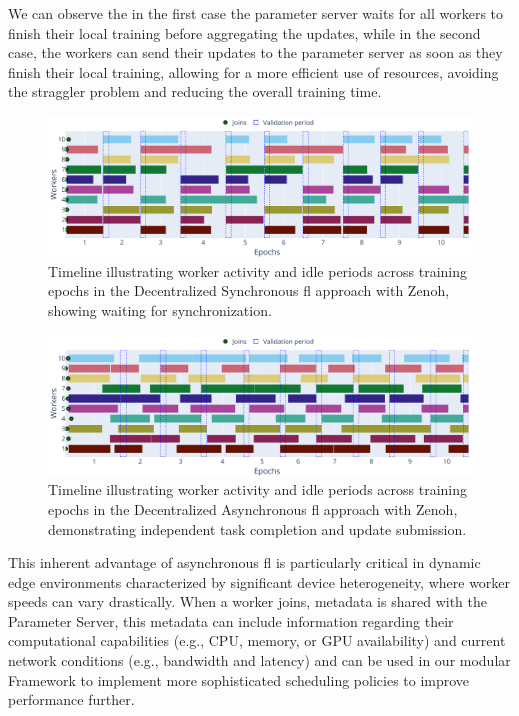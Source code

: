 We can observe the in the first case the parameter server waits for all workers to finish their local training before aggregating the updates, while in the second case, the workers can send their updates to the parameter server as soon as they finish their local training, allowing for a more efficient use of resources, avoiding the straggler problem and reducing the overall training time.

\begin{figure}[!htb]
    \centering
    \includegraphics[width=\linewidth]{figs/scenario1/ds_timeline.pdf}
    \caption[Timeline of Decentralized Synchronous FL with Zenoh]{Timeline illustrating worker activity and idle periods across training epochs in the Decentralized Synchronous \ac{fl} approach with Zenoh, showing waiting for synchronization.}
    \label{fig:ds_timeline}
\end{figure}

\begin{figure}[!htb]
    \centering
    \includegraphics[width=\linewidth]{figs/scenario1/da_timeline.pdf}
    \caption[Timeline of Decentralized Asynchronous FL with Zenoh]{Timeline illustrating worker activity and idle periods across training epochs in the Decentralized Asynchronous \ac{fl} approach with Zenoh, demonstrating independent task completion and update submission.}
    \label{fig:da_timeline}
\end{figure}

This inherent advantage of asynchronous \ac{fl} is particularly critical in dynamic edge environments characterized by significant device heterogeneity, where worker speeds can vary drastically. When a worker joins, metadata is shared with the Parameter Server, this metadata can include information regarding their computational capabilities (e.g., CPU, memory, or GPU availability) and current network conditions (e.g., bandwidth and latency) and can be used in our modular Framework to implement more sophisticated scheduling policies to improve performance further. 

